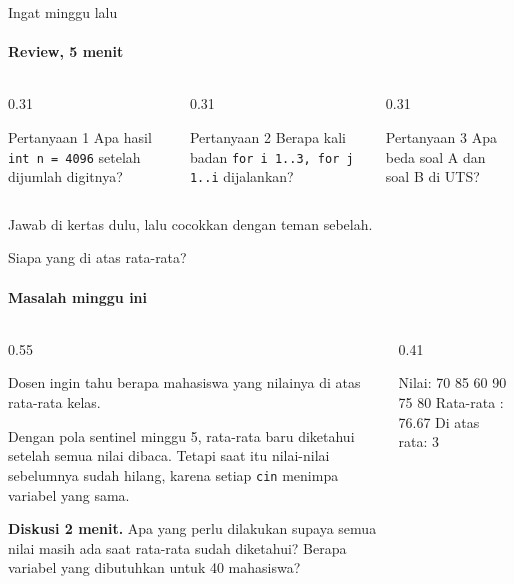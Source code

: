 \documentclass[t]{beamer}
\begin{document}
\begin{frame}{Ingat minggu lalu}
\framesubtitle{Review, 5 menit}
\begin{columns}[T]
\begin{column}{0.31\textwidth}
\begin{BlokGelap}{Pertanyaan 1}
Apa hasil \texttt{int n = 4096} setelah dijumlah digitnya?
\end{BlokGelap}
\end{column}
\begin{column}{0.31\textwidth}
\begin{BlokGelap}{Pertanyaan 2}
Berapa kali badan \texttt{for i 1..3, for j 1..i} dijalankan?
\end{BlokGelap}
\end{column}
\begin{column}{0.31\textwidth}
\begin{BlokGelap}{Pertanyaan 3}
Apa beda soal A dan soal B di UTS?
\end{BlokGelap}
\end{column}
\end{columns}
\vspace{8pt}
Jawab di kertas dulu, lalu cocokkan dengan teman sebelah.
\end{frame}


\begin{frame}[fragile]{Siapa yang di atas rata-rata?}
\framesubtitle{Masalah minggu ini}
\begin{columns}[T]
\begin{column}{0.55\textwidth}
{\small Dosen ingin tahu berapa mahasiswa yang nilainya di atas rata-rata kelas.

\vspace{6pt}
Dengan pola sentinel minggu 5, rata-rata baru diketahui setelah semua nilai dibaca. Tetapi saat itu nilai-nilai sebelumnya sudah hilang, karena setiap \texttt{cin} menimpa variabel yang sama.\par}
\vspace{6pt}
\begin{Catatan}
\textbf{Diskusi 2 menit.} Apa yang perlu dilakukan supaya semua nilai masih ada saat rata-rata sudah diketahui? Berapa variabel yang dibutuhkan untuk 40 mahasiswa?
\end{Catatan}
\end{column}
\begin{column}{0.41\textwidth}
\begin{Keluaran}[]
Nilai: 70 85 60 90 75 80
Rata-rata   : 76.67
Di atas rata: 3
\end{Keluaran}
\end{column}
\end{columns}
\end{frame}
\end{document}
